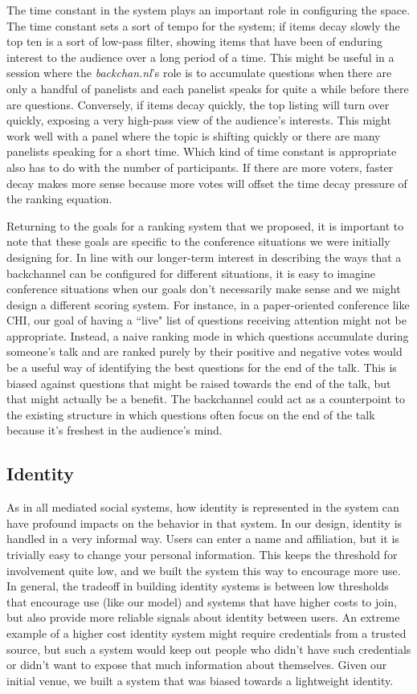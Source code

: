 The time constant in the system plays an important role in configuring the space. The time constant sets a sort of tempo for the system; if items decay slowly the top ten is a sort of low-pass filter, showing items that have been of enduring interest to the audience over a long period of a time. This might be useful in a session where the \emph{backchan.nl}'s role is to accumulate questions when there are only a handful of panelists and each panelist speaks for quite a while before there are questions. Conversely, if items decay quickly, the top listing will turn over quickly, exposing a very high-pass view of the audience's interests. This might work well with a panel where the topic is shifting quickly or there are many panelists speaking for a short time. Which kind of time constant is appropriate also has to do with the number of participants. If there are more voters, faster decay makes more sense because more votes will offset the time decay pressure of the ranking equation.

Returning to the goals for a ranking system that we proposed, it is important to note that these goals are specific to the conference situations we were initially designing for. In line with our longer-term interest in describing the ways that a backchannel can be configured for different situations, it is easy to imagine conference situations when our goals don't necessarily make sense and we might design a different scoring system. For instance, in a paper-oriented conference like CHI, our goal of having a ``live" list of questions receiving attention might not be appropriate. Instead, a naive ranking mode in which questions accumulate during someone's talk and are ranked purely by their positive and negative votes would be a useful way of identifying the best questions for the end of the talk. This is biased against questions that might be raised towards the end of the talk, but that might actually be a benefit. The backchannel could act as a counterpoint to the existing structure in which questions often focus on the end of the talk because it's freshest in the audience's mind.


\subsection{Identity}
As in all mediated social systems, how identity is represented in the system can have profound impacts on the behavior in that system. In our design, identity is handled in a very informal way. Users can enter a name and affiliation, but it is trivially easy to change your personal information. This keeps the threshold for involvement quite low, and we built the system this way to encourage more use. In general, the tradeoff in building identity systems is between low thresholds that encourage use (like our model) and systems that have higher costs to join, but also provide more reliable signals about identity between users. An extreme example of a higher cost identity system might require credentials from a trusted source, but such a system would keep out people who didn't have such credentials or didn't want to expose that much information about themselves. Given our initial venue, we built a system that was biased towards a lightweight identity.

